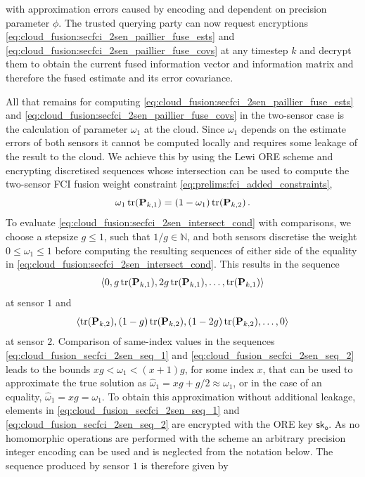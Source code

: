 with approximation errors caused by encoding and dependent on precision parameter $\phi$. The trusted querying party can now request encryptions \eqref{eq:cloud_fusion:secfci_2sen_paillier_fuse_ests} and \eqref{eq:cloud_fusion:secfci_2sen_paillier_fuse_covs} at any timestep $k$ and decrypt them to obtain the current fused information vector and information matrix and therefore the fused estimate and its error covariance.

All that remains for computing \eqref{eq:cloud_fusion:secfci_2sen_paillier_fuse_ests} and \eqref{eq:cloud_fusion:secfci_2sen_paillier_fuse_covs} in the two-sensor case is the calculation of parameter $\omega_1$ at the cloud. Since $\omega_1$ depends on the estimate errors of both sensors it cannot be computed locally and requires some leakage of the result to the cloud. We achieve this by using the Lewi ORE scheme and encrypting discretised sequences whose intersection can be used to compute the two-sensor FCI fusion weight constraint \eqref{eq:prelims:fci_added_constraints},
\begin{equation}\label{eq:cloud_fusion:secfci_2sen_intersect_cond}
    \omega_1\operatorname{tr}({{\mathbf{P}}}_{k,1}) = (1-\omega_1)\operatorname{tr}({{\mathbf{P}}}_{k,2})\,.
\end{equation}
To evaluate \eqref{eq:cloud_fusion:secfci_2sen_intersect_cond} with comparisons, we choose a stepsize $g\leq 1$, such that $1/g \in \mathbb{N}$, and both sensors discretise the weight $0\leq\omega_1\leq 1$ before computing the resulting sequences of either side of the equality in \eqref{eq:cloud_fusion:secfci_2sen_intersect_cond}. This results in the sequence
\begin{equation}\label{eq:cloud_fusion_secfci_2sen_seq_1}
    \left\langle0, g\operatorname{tr}({{\mathbf{P}}}_{k,1}), 2g\operatorname{tr}({{\mathbf{P}}}_{k,1}),\dots,\operatorname{tr}({{\mathbf{P}}}_{k,1})\right\rangle
\end{equation}
at sensor $1$ and
\begin{equation}\label{eq:cloud_fusion_secfci_2sen_seq_2}
    \left\langle\operatorname{tr}({{\mathbf{P}}}_{k,2}), (1-g)\operatorname{tr}({{\mathbf{P}}}_{k,2}), (1-2g)\operatorname{tr}({{\mathbf{P}}}_{k,2}),\dots,0\right\rangle
\end{equation}
at sensor $2$. Comparison of same-index values in the sequences \eqref{eq:cloud_fusion_secfci_2sen_seq_1} and \eqref{eq:cloud_fusion_secfci_2sen_seq_2} leads to the bounds $xg<\omega_1<(x+1)g$, for some index $x$, that can be used to approximate the true solution as $\hat{\omega}_1 = xg+ g/2 \approx \omega_1$, or in the case of an equality, $\hat{\omega}_1 = xg = \omega_1$. To obtain this approximation without additional leakage, elements in \eqref{eq:cloud_fusion_secfci_2sen_seq_1} and \eqref{eq:cloud_fusion_secfci_2sen_seq_2} are encrypted with the ORE key $\mathsf{sk}_{\mathsf{o}}$. As no homomorphic operations are performed with the scheme an arbitrary precision integer encoding can be used and is neglected from the notation below. The sequence produced by sensor $1$ is therefore given by
